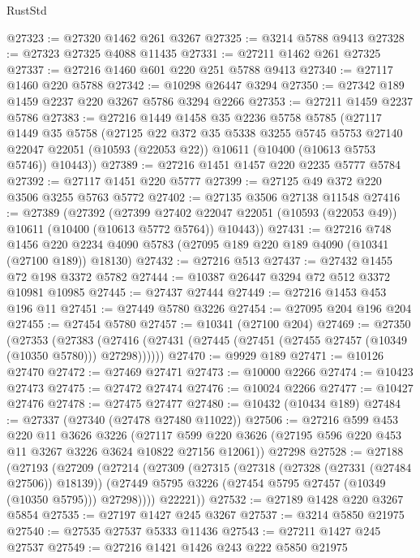 \begin{lexlean}{RustStd}
\begin{coremodule}
{\begin{coremodule}
{{{{{{{{{{{{{{{{{{{{{{{{{@27323 := @27320 @1462 @261 @3267
@27325 := @3214 @5788 @9413
@27328 := @27323 @27325 @4088 @11435
@27331 := @27211 @1462 @261 @27325
@27337 := @27216 @1460 @601 @220 @251 @5788 @9413
@27340 := @27117 @1460 @220 @5788
@27342 := @10298 @26447 @3294
@27350 := @27342 @189 @1459 @2237 @220 @3267 @5786 @3294 @2266
@27353 := @27211 @1459 @2237 @5786
@27383 := @27216
    @1449
    @1458
    @35
    @2236
    @5758
    @5785
    (@27117
      @1449
      @35
      @5758
      (@27125
        @22
        @372
        @35
        @5338
        @3255
        @5745
        @5753
        @27140
        @22047
        @22051
        (@10593 (@22053 @22))
        @10611
        (@10400 (@10613 @5753 @5746))
        @10443))
@27389 := @27216 @1451 @1457 @220 @2235 @5777 @5784
@27392 := @27117 @1451 @220 @5777
@27399 := @27125 @49 @372 @220 @3506 @3255 @5763 @5772
@27402 := @27135 @3506 @27138 @11548
@27416 := @27389
    (@27392
      (@27399
        @27402
        @22047
        @22051
        (@10593 (@22053 @49))
        @10611
        (@10400 (@10613 @5772 @5764))
        @10443))
@27431 := @27216
    @748
    @1456
    @220
    @2234
    @4090
    @5783
    (@27095 @189 @220 @189 @4090 (@10341 (@27100 @189)) @18130)
@27432 := @27216 @513
@27437 := @27432 @1455 @72 @198 @3372 @5782
@27444 := @10387 @26447 @3294 @72 @512 @3372 @10981 @10985
@27445 := @27437 @27444
@27449 := @27216 @1453 @453 @196 @11
@27451 := @27449 @5780 @3226
@27454 := @27095 @204 @196 @204
@27455 := @27454 @5780
@27457 := @10341 (@27100 @204)
@27469 := @27350
    (@27353
      (@27383 (@27416 (@27431 (@27445 (@27451 (@27455 @27457 (@10349 (@10350 @5780))) @27298))))))
@27470 := @9929 @189
@27471 := @10126 @27470
@27472 := @27469 @27471
@27473 := @10000 @2266
@27474 := @10423 @27473
@27475 := @27472 @27474
@27476 := @10024 @2266
@27477 := @10427 @27476
@27478 := @27475 @27477
@27480 := @10432 (@10434 @189)
@27484 := @27337 (@27340 (@27478 @27480 @11022))
@27506 := @27216
    @599
    @453
    @220
    @11
    @3626
    @3226
    (@27117 @599 @220 @3626 (@27195 @596 @220 @453 @11 @3267 @3226 @3624 @10822 @27156 @12061))
    @27298
@27528 := @27188
    (@27193
      (@27209
        (@27214
          (@27309
            (@27315
              (@27318 (@27328 (@27331 (@27484 @27506)) @18139))
              (@27449 @5795 @3226 (@27454 @5795 @27457 (@10349 (@10350 @5795))) @27298))))
        @22221))
@27532 := @27189 @1428 @220 @3267 @5854
@27535 := @27197 @1427 @245 @3267
@27537 := @3214 @5850 @21975
@27540 := @27535 @27537 @5333 @11436
@27543 := @27211 @1427 @245 @27537
@27549 := @27216 @1421 @1426 @243 @222 @5850 @21975
}}}}}}}}}}}}}}}}}}}}}}}}}
\end{coremodule}}
\end{coremodule}
\end{lexlean}
